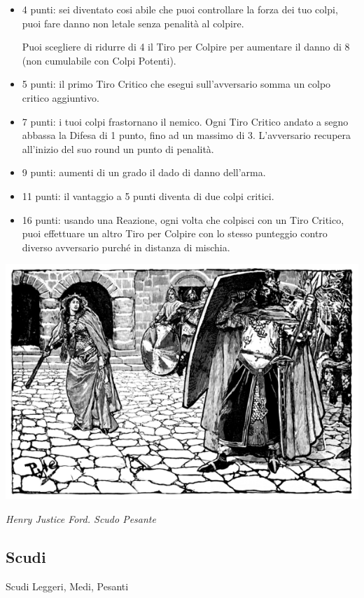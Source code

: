 \begin{multicols}{2}
\begin{itemize}[leftmargin=*] \setlength{\itemsep}{0pt}
\item 4 punti: sei diventato cosi abile che puoi controllare la forza dei tuo colpi, puoi fare danno non letale senza penalità al colpire.

Puoi scegliere di ridurre di 4 il Tiro per Colpire per aumentare il danno di 8 (non cumulabile con Colpi Potenti).
\item 5 punti: il primo Tiro Critico che esegui sull'avversario somma un colpo critico aggiuntivo.
\item 7 punti: i tuoi colpi frastornano il nemico. Ogni Tiro Critico andato a segno abbassa la Difesa di 1 punto, fino ad un massimo di 3. L'avversario recupera all'inizio del suo round un punto di penalità.
\item 9 punti: aumenti di un grado il dado di danno dell'arma.
\item 11 punti: il vantaggio a 5 punti diventa di due colpi critici.
\item 16 punti: usando una Reazione, ogni volta che colpisci con un Tiro Critico, puoi effettuare un altro Tiro per Colpire con lo stesso punteggio contro diverso avversario purché in distanza di mischia.

\end{itemize}

\begin{center}
	\includegraphics[width=0.9\linewidth]{immagini/scudotorre.png}

	\emph{Henry Justice Ford. Scudo Pesante}
\end{center}

\subsection{Scudi} Scudi Leggeri, Medi, Pesanti\label{listaarmiscudi}


\end{multicols}

